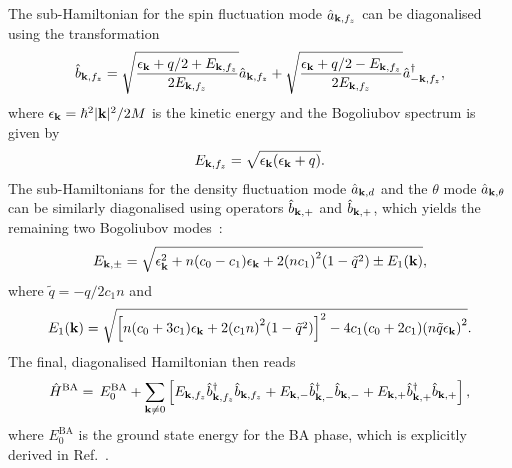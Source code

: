 The sub-Hamiltonian for the spin fluctuation mode \(\hat{a}_{\vb{k}, f_z}\) can
be diagonalised using the transformation
\begin{align}
    \hat{b}_{\vb{k}, f_z} = \sqrt{\frac{\epsilon_{\vb{k}} + q/2
    + E_{\vb{k}, f_z}}{2E_{\vb{k}, f_z}}}\hat{a}_{\vb{k}, f_z}
    + \sqrt{\frac{\epsilon_{\vb{k}} + q/2 - E_{\vb{k}, f_z}}{2E_{\vb{k}, f_z}}}
    \hat{a}_{-\vb{k}, f_z}^\dagger,
\end{align}
where \(\epsilon_{\vb{k}} = \hbar^2|\vb{k}|^2/2M\) is the kinetic energy and the
Bogoliubov spectrum is given by
\begin{align}\label{eq: e_k-fz}
    E_{\vb{k}, {f_z}} = \sqrt{\epsilon_{\vb{k}}(\epsilon_{\vb{k}} + q)}.
\end{align}
The sub-Hamiltonians for the density fluctuation mode \(\hat{a}_{\vb{k}, d}\)
and the \(\theta \) mode
\(\hat{a}_{\vb{k}, \theta}\) can be similarly diagonalised using operators
\(\hat{b}_{\vb{k}, +}\) and \(\hat{b}_{\vb{k}, +}\), which yields the remaining
two Bogoliubov modes~\cite{Uchino2010}:
\begin{align}\label{eq: e_k-pm}
    E_{\vb{k}, \pm}= \sqrt{\epsilon_{\vb{k}}^2 + n(c_0-c_1)\epsilon_{\vb{k}}
        + 2{(nc_1)}^2(1 - \tilde{q}^2) \pm E_1(\vb{k})},
\end{align}
where \(\tilde{q} = -q/2c_1n\) and
\begin{align}
    E_1(\vb{k}) = \sqrt{{\left[n{(c_0 + 3c_1)}\epsilon_{\vb{k}}
                    + 2{(c_1n)}^2(1-\tilde{q}^2)\right]}^2
        - 4c_1(c_0+2c_1){(n\tilde{q}\epsilon_{\vb{k}})}^2}.
\end{align}
The final, diagonalised Hamiltonian then reads
\begin{align}
    \hat{H}^\text{BA} =\, E_0^\text{BA}
    + \sum_{\vb{k} \neq 0}\left[E_{\vb{k}, f_z}\hat{b}^\dagger_{\vb{k}, f_z}
    \hat{b}_{\vb{k}, f_z}
    + E_{\vb{k}, -}\hat{b}^\dagger_{\vb{k}, -}\hat{b}_{\vb{k}, -}
    + E_{\vb{k}, +}\hat{b}^\dagger_{\vb{k}, +}\hat{b}_{\vb{k}, +}\right],
\end{align}
where \(E_0^\text{BA}\) is the ground state energy for the
BA phase, which is explicitly derived in Ref.~\cite{Uchino2010}.

